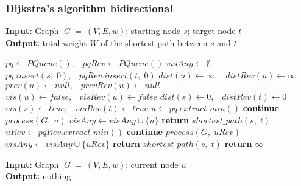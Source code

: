 \documentclass{article}
\begin{document}
\subsubsection{Dijkstra's algorithm bidirectional}
\begin{algorithm}
\begin{minipage}[t]{0.48\textwidth}
\textbf{Input:} Graph $\;G\:=\:(V, E,w)$; starting node $s$; target node $t$\\
\textbf{Output:} total weight $W$ of the shortest path between $s$ and $t$
\begin{algorithmic}[1]
    \State $pq \gets PQueue(),\;\;\;pqRev \gets PQueue()$
    \State $visAny \gets \emptyset$
        \State $pq.insert(s,\;0),\;\;\;pqRev.insert(t,\;0)$
            \State $dist(u) \gets \infty, \;\;\; distRev(u) \gets \infty$
            \State $prev(u) \gets null,\;\;\; prevRev(u) \gets null$
            \State $vis(u) \gets false, \;\;\ visRev(u) \gets false$
        \EndFor
        \State $dist(s) \gets 0,  \;\;\;distRev(t) \gets 0$
        \State $vis(s)\gets true, \;\;\; visRev(t)\gets true$
            \State $u \gets pq.extract\_min()$
                \State \textbf{continue}
            \EndIf
            \State $process(G,\;u)$
            \State $visAny \gets visAny \cup \{u\}$
                \State \textbf{return} $shortest\_path(s,\;t)$
            \EndIf
            \State $uRev \gets pqRev.extract\_min()$
                \State \textbf{continue}
            \EndIf
            \State $process(G,\;uRev)$
            \State $visAny \gets visAny \cup \{uRev\}$
                \State \textbf{return} $shortest\_path(s,\;t)$
            \EndIf
                \State \textbf{return} $\infty$
            \EndIf
        \EndWhile
    \EndFunction
\end{algorithmic}
\end{minipage}
\hfill
\begin{minipage}[t]{0.49\textwidth}
\textbf{Input:} Graph $\;G\:=\:(V, E,w)$; current node $u$\\
\textbf{Output:} nothing
\begin{algorithmic}[1]

\end{algorithmic}
\end{minipage}
\end{algorithm}
\end{document}
